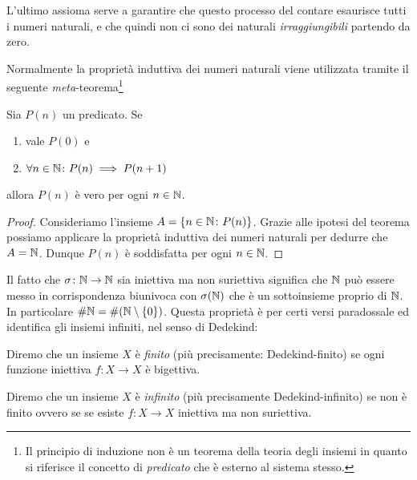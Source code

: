 L'ultimo assioma serve a garantire che questo processo del contare esaurisce tutti 
i numeri naturali, e che quindi non ci sono dei naturali \emph{irraggiungibili}
partendo da zero.

Normalmente la proprietà induttiva dei numeri naturali viene utilizzata tramite 
il seguente \emph{meta}-teorema\footnote{%
Il principio di induzione non è un teorema della teoria degli insiemi 
in quanto si riferisce il concetto di \emph{predicato} che è esterno 
al sistema stesso.}

\begin{theorem}
  Sia $P(n)$ un predicato.
  Se 
  \begin{enumerate}
    \item vale $P(0)$ e 
    \item $\forall n\in \mathbb N\colon P(n)\implies P(n+1)$
  \end{enumerate} 
  allora $P(n)$ è vero per ogni $n\in \mathbb N$.
\end{theorem}
%
\begin{proof}
  Consideriamo l'insieme $A=\{n\in \mathbb N\colon P(n)\}$.
  Grazie alle ipotesi del teorema possiamo applicare la proprietà 
  induttiva dei numeri naturali per dedurre che $A=\mathbb N$.
  Dunque $P(n)$ è soddisfatta per ogni $n\in\mathbb N$.
\end{proof}

Il fatto che $\sigma\colon \mathbb N\to \mathbb N$ sia iniettiva ma non suriettiva 
significa che $\mathbb N$ può essere messo in corrispondenza biunivoca con $\sigma(\mathbb N)$ 
che è un sottoinsieme proprio di $\mathbb N$.
In particolare $\#\mathbb N = \#{\left( \mathbb N \setminus{\left\{ 0 \right\}} \right)}$.
Questa proprietà è per certi versi paradossale ed identifica gli 
insiemi infiniti, nel senso di Dedekind:

\begin{definition}
  \label{def:infinito}%
  Diremo che un insieme $X$ è \emph{finito}
  (più precisamente: Dedekind-finito)
  se ogni funzione iniettiva $f\colon X\to X$ è bigettiva.

  Diremo che un insieme $X$ è \emph{infinito} 
  (più precisamente Dedekind-infinito)
  se non è finito ovvero se
  se esiste $f\colon X\to X$ iniettiva ma non suriettiva.
\end{definition}

